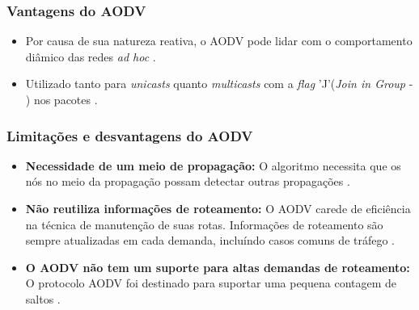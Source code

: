 \subsubsection{Vantagens do AODV}
\begin{itemize}
	\item Por causa de sua natureza reativa, o AODV pode lidar com o comportamento di\^amico das redes \textit{ad hoc} \cite{schwingenschlogl}.
	\item Utilizado tanto para \textit{unicasts} quanto \textit{multicasts} com a \textit{flag} 'J'(\textit{Join in Group} -  ) nos pacotes \cite{ramachandranTech}.
\end{itemize}

\subsubsection{Limita\c{c}\~oes e desvantagens do AODV}
\begin{itemize}
	\item \textbf{Necessidade de um meio de propaga\c{c}\~ ao:} O algoritmo necessita que os n\'os no meio da propaga\c{c}\~ ao possam detectar outras propaga\c{c}\~oes \cite{gorantala}.
	\item \textbf{N\~ao reutiliza informa\c{c}\~oes de roteamento:} O AODV carede de efici\^encia na t\'ecnica de manuten\c{c}\~ao de suas rotas. Informa\c{c}\~oes de roteamento s\~ao sempre atualizadas em cada demanda, inclu\'indo casos comuns de tr\'afego \cite{ramachandran}.
	\item \textbf{O AODV n\~ao tem um suporte para altas demandas de roteamento:} O protocolo AODV foi destinado para suportar uma pequena contagem de saltos \cite{ramachandran}.
\end{itemize}
